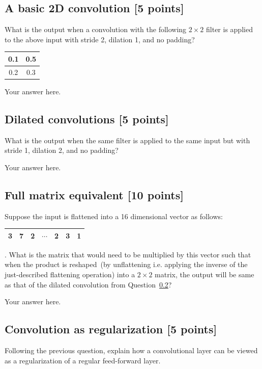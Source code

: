 \documentclass[a4paper]{article}
\theoremstyle{definition}
\begin{document}
\subsection{A basic 2D convolution [5 points]}

What is the output when a convolution with the following $2\times 2$ filter is applied to the above input with stride 2, dilation 1, and no padding?

\begin{tabular}{|c|c|}
	\hline
	0.1 & 0.5 \\
	\hline
	0.2 & 0.3 \\
	\hline
\end{tabular}

{\color{blue} Your answer here.}

\subsection{Dilated convolutions [5 points]}\label{sec:dilated}

What is the output when the same filter is applied to the same input but with stride 1, dilation 2, and no padding?

{\color{blue} Your answer here.}

\subsection{Full matrix equivalent [10 points]}

Suppose the input is flattened into a 16 dimensional vector as follows:
\begin{tabular}{|c|c|c|c|c|c|c|}
	\hline
	3 & 7 & 2 & $\cdots$ & 2 & 3 & 1 \\
	\hline
\end{tabular}.
What is the matrix that would need to be multiplied by this vector such that when the product is reshaped~(by unflattening i.e. applying the inverse of the just-described flattening operation) into a $2\times2$ matrix, the output will be same as that of the dilated convolution from Question~\ref{sec:dilated}?

{\color{blue} Your answer here.}

\subsection{Convolution as regularization [5 points]}

Following the previous question, explain how a convolutional layer can be viewed as a regularization of a regular feed-forward layer.
\end{document}
